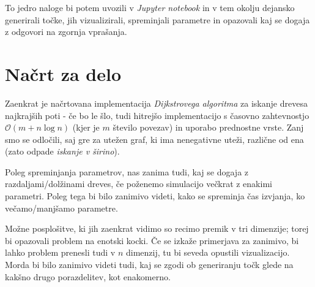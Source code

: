 \documentclass[12pt,a4paper]{article}
\begin{document}
To jedro naloge bi potem uvozili v \emph{Jupyter notebook} in v tem okolju dejansko 
generirali točke, jih vizualizirali, spreminjali parametre in opazovali kaj se dogaja
z odgovori na zgornja vprašanja.


\section{Načrt za delo}
Zaenkrat je načrtovana implementacija \emph{Dijkstrovega algoritma} za iskanje 
drevesa najkrajših poti - če bo le šlo, tudi hitrejšo implementacijo s časovno 
zahtevnostjo $\mathcal{O}(m + n\log n)$ (kjer je $m$ število povezav) in uporabo 
prednostne vrste. Zanj smo se odločili, saj gre za utežen graf, ki ima 
nenegativne uteži, različne od ena (zato odpade \emph{iskanje v širino}). 

Poleg spreminjanja parametrov, nas zanima tudi, kaj se dogaja z razdaljami/dolžinami 
dreves, če poženemo simulacijo večkrat z enakimi parametri. Poleg tega bi bilo zanimivo 
videti, kako se spreminja čas izvjanja, ko večamo/manjšamo parametre. 

Možne posplošitve, ki jih zaenkrat vidimo so recimo premik v tri dimenzije; torej bi 
opazovali problem na enotski kocki. Če se izkaže primerjava za zanimivo, bi lahko 
problem prenesli tudi v $n$ dimenzij, tu bi seveda opustili vizualizacijo. Morda bi 
bilo zanimivo videti tudi, kaj se zgodi ob generiranju točk glede na kakšno drugo
porazdelitev, kot enakomerno.
\end{document}
